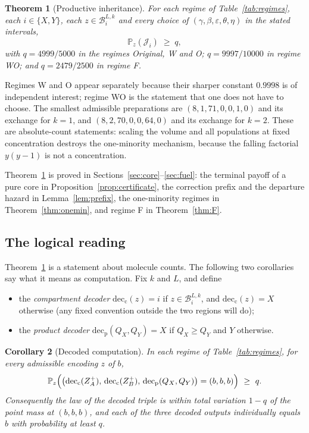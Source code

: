 \documentclass[11pt,a4paper]{article}
\theoremstyle{plain}
\newtheorem{theorem}{Theorem}[section]
\newtheorem{corollary}[theorem]{Corollary}
\theoremstyle{definition}
\theoremstyle{remark}
\newcommand{\Prob}{\mathbb P}
\newcommand{\B}{\mathcal B}
\newcommand{\eps}{\varepsilon}
\begin{document}
\begin{theorem}[Productive inheritance]\label{thm:main}
For each regime of Table~\ref{tab:regimes}, each $i\in\{X,Y\}$, each $z\in\B_i^{L,k}$ and
every choice of $(\gamma,\beta,\eps,\theta,\eta)$ in the stated intervals,
\begin{equation}
\Prob_z(\mathcal J_i)\;\ge\;q,
\end{equation}
with $q=4999/5000$ in the regimes Original, W and O; $q=9997/10000$ in regime WO; and
$q=2479/2500$ in regime F.
\end{theorem}

Regimes W and O appear separately because their sharper constant $0.9998$ is of
independent interest; regime WO is the statement that one does not have to choose. The
smallest admissible preparations are $(8,1,71,0,0,1,0)$ and its exchange for $k=1$, and
$(8,2,70,0,0,64,0)$ and its exchange for $k=2$. These are absolute-count statements:
scaling the volume and all populations at fixed concentration destroys the one-minority
mechanism, because the falling factorial $y(y-1)$ is not a concentration.

Theorem~\ref{thm:main} is proved in Sections~\ref{sec:core}--\ref{sec:fuel}: the terminal
payoff of a pure core in Proposition~\ref{prop:certificate}, the correction prefix and
the departure hazard in Lemma~\ref{lem:prefix}, the one-minority regimes in
Theorem~\ref{thm:onemin}, and regime F in Theorem~\ref{thm:F}.

\subsection{The logical reading}

Theorem~\ref{thm:main} is a statement about molecule counts. The following two
corollaries say what it means as computation. Fix $k$ and $L$, and define

\begin{itemize}[leftmargin=1.2em]
\item the \emph{compartment decoder} $\mathrm{dec}_{\mathrm c}(z)=i$ if
  $z\in\B_i^{L,k}$, and $\mathrm{dec}_{\mathrm c}(z)=X$ otherwise (any fixed convention
  outside the two regions will do);
\item the \emph{product decoder} $\mathrm{dec}_{\mathrm p}(Q_X,Q_Y)=X$ if $Q_X\ge Q_Y$
  and $Y$ otherwise.
\end{itemize}

\begin{corollary}[Decoded computation]\label{cor:decoder}
In each regime of Table~\ref{tab:regimes}, for every admissible encoding $z$ of $b$,
\begin{equation}
\Prob_z\Bigl(\bigl(\mathrm{dec}_{\mathrm c}(Z_A^+),\,\mathrm{dec}_{\mathrm c}(Z_B^+),\,
\mathrm{dec}_{\mathrm p}(Q_X,Q_Y)\bigr)=(b,b,b)\Bigr)\ \ge\ q .
\end{equation}
Consequently the law of the decoded triple is within total variation $1-q$ of the point
mass at $(b,b,b)$, and each of the three decoded outputs individually equals $b$ with
probability at least $q$.
\end{corollary}
\end{document}

